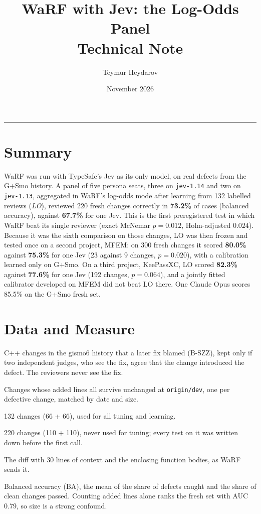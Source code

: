\documentclass[11pt,a4paper]{article}
\title{\textbf{WaRF with Jev: the Log-Odds Panel}\\[0.4em]
\large Technical Note}
\author{Teymur Heydarov}
\date{November 2026}
\begin{document}
\maketitle
\tableofcontents
\bigskip\hrule
\bigskip

\section{Summary}

WaRF was run with TypeSafe's Jev as its only model, on real defects from the
G+Smo history. A panel of five persona seats, three on \texttt{jev-1.14} and two
on \texttt{jev-1.13}, aggregated in WaRF's log-odds mode after learning from
132 labelled reviews (\emph{LO}), reviewed 220 fresh changes correctly in
\textbf{73.2\%} of cases (balanced accuracy), against \textbf{67.7\%} for one
Jev. This is the first preregistered test in which WaRF beat its single
reviewer (exact McNemar $p = 0.012$, Holm-adjusted $0.024$). Because it was the
sixth comparison on those changes, LO was then frozen and tested once on a
second project, MFEM: on 300 fresh changes it scored \textbf{80.0\%} against
\textbf{75.3\%} for one Jev (23 against 9 changes, $p = 0.020$), with a
calibration learned only on G+Smo. On a third project, KeePassXC, LO scored
\textbf{82.3\%} against \textbf{77.6\%} for one Jev (192 changes, $p = 0.064$),
and a jointly fitted calibrator developed on MFEM did not beat LO there.
One Claude Opus scores 85.5\% on the G+Smo fresh set.

\section{Data and Measure}

\begin{description}[leftmargin=1.5em]
\item[Defective changes] C++ changes in the gismo6 history that a later fix
  blamed (B-SZZ), kept only if two independent judges, who see the fix,
  agree that the change introduced the defect. The reviewers never see the fix.
\item[Clean changes] Changes whose added lines all survive unchanged at
  \texttt{origin/dev}, one per defective change, matched by date and size.
\item[Development set] 132 changes (66 + 66), used for all tuning and learning.
\item[Fresh set] 220 changes (110 + 110), never used for tuning; every test on
  it was written down before the first call.
\item[Input] The diff with 30 lines of context and the enclosing function
  bodies, as WaRF sends it.
\item[Measure] Balanced accuracy (BA), the mean of the share of defects caught
  and the share of clean changes passed. Counting added lines alone ranks the
  fresh set with AUC 0.79, so size is a strong confound.
\end{description}
\end{document}
